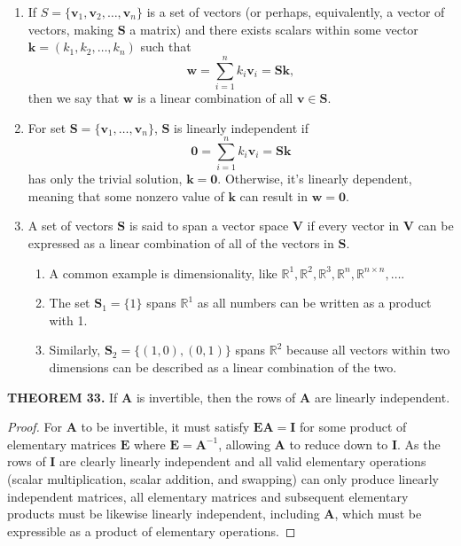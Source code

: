 \documentclass[12pt]{article}
\newcommand{\mat}[1]{\mathbf{#1}}
\newcommand{\theorem}[2]{\textbf{THEOREM #1.} #2}
\begin{document}
\begin{enumerate}
\item If $S = \{ \mat{v}_{1}, \mat{v}_{2}, \dots, \mat{v}_{n} \}$ is a set of vectors (or perhaps, equivalently, a vector of vectors, making $\mat{S}$ a matrix) and there exists scalars within some vector $\mat{k} = (k_{1}, k_{2}, \dots, k_{n})$ such that
\begin{equation}
\mat{w} = \sum_{i=1}^{n} k_{i} \mat{v}_{i} = \mat{Sk},
\end{equation}
then we say that $\mat{w}$ is a linear combination of all $\mat{v} \in \mat{S}$.
\item For set $\mat{S} = \{ \mat{v}_{1}, \dots, \mat{v}_{n} \}$, $\mat{S}$ is linearly independent if
\begin{equation}
\mat{0} = \sum_{i=1}^{n} k_{i} \mat{v}_{i} = \mat{Sk}
\end{equation}
has only the trivial solution, $\mat{k = 0}$. Otherwise, it's linearly dependent, meaning that some nonzero value of $\mat{k}$ can result in $\mat{w=0}$.
\item A set of vectors $\mat{S}$ is said to span a vector space $\mat{V}$ if every vector in $\mat{V}$ can be expressed as a linear combination of all of the vectors in $\mat{S}$.
\begin{enumerate}
\item A common example is dimensionality, like $\mathbb{R}^{1}, \mathbb{R}^{2}, \mathbb{R}^{3}, \mathbb{R}^{n}, \mathbb{R}^{n \times n}, \dots$. 
\item The set $\mat{S}_{1} = \{1\}$ spans $\mathbb{R}^{1}$ as all numbers can be written as a product with 1.
\item Similarly, $\mat{S}_{2} = \{(1,0), (0,1)\}$ spans $\mathbb{R}^{2}$ because all vectors within two dimensions can be described as a linear combination of the two.
\end{enumerate}
\end{enumerate}

\theorem{33}{If $\mat{A}$ is invertible, then the rows of $\mat{A}$ are linearly independent.}

\begin{proof}
For $\mat{A}$ to be invertible, it must satisfy $\mat{EA=I}$ for some product of elementary matrices $\mat{E}$ where $\mat{E}=\mat{A}^{-1}$, allowing $\mat{A}$ to reduce down to $\mat{I}$. As the rows of $\mat{I}$ are clearly linearly independent and all valid elementary operations (scalar multiplication, scalar addition, and swapping) can only produce linearly independent matrices, all elementary matrices and subsequent elementary products must be likewise linearly independent, including $\mat{A}$, which must be expressible as a product of elementary operations.    
\end{proof}
\end{document}

